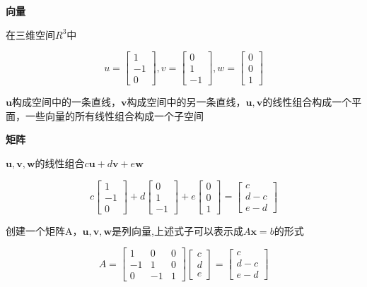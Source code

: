 \documentclass{ctexart}
\begin{document}
	\textbf{向量}
	
	在三维空间\(R^3\)中
	
	\[u = \begin{bmatrix}
	1 \\
	-1 \\
	0
	\end{bmatrix}, v = \begin{bmatrix}
	0 \\
	1 \\
	-1
	\end{bmatrix}, w = \begin{bmatrix}
	0 \\
	0 \\
	1
	\end{bmatrix}\]

	\(\bm{u}\)构成空间中的一条直线，\(\bm{v}\)构成空间中的另一条直线，\(\bm{u, v}\)的线性组合构成一个平面，一些向量的所有线性组合构成一个子空间
	
	\textbf{矩阵}
	
	\(\bm{u,v,w}\)的线性组合\(c\bm{u}+d\bm{v}+e\bm{w}\)
	
	\[c\begin{bmatrix}
	1 \\
	-1 \\
	0
	\end{bmatrix} + d\begin{bmatrix}
	0 \\
	1 \\
	-1 
	\end{bmatrix} + e\begin{bmatrix}
	0 \\
	0 \\
	1
	\end{bmatrix} = \begin{bmatrix}
	c \\
	d - c \\
	e - d
	\end{bmatrix}\]
	
	
	创建一个矩阵A，\(\bm{u,v,w}\)是列向量,上述式子可以表示成\(A\bm{x}=b\)的形式
	
	\[A = \begin{bmatrix}
	1 & 0 & 0 \\
	-1 & 1 & 0 \\
	0 & -1 & 1
	\end{bmatrix} \begin{bmatrix}
	c \\
	d \\
	e
	\end{bmatrix} = \begin{bmatrix}
	c \\
	d - c \\
	e - d
	\end{bmatrix}\]
	
\end{document}

